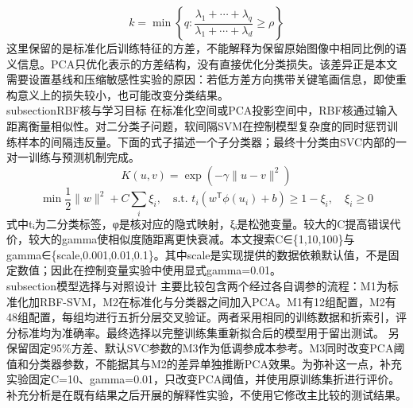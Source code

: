 \documentclass[supercite]{HustGSClassPaper}
\begin{document}
\begin{equation}
k=\min\left\{q:\frac{\lambda_1+\cdots+\lambda_q}{\lambda_1+\cdots+\lambda_d}\ge\rho\right\}
\end{equation}
这里保留的是标准化后训练特征的方差，不能解释为保留原始图像中相同比例的语义信息。PCA只优化表示的方差结构，没有直接优化分类损失。该差异正是本文需要设置基线和压缩敏感性实验的原因：若低方差方向携带关键笔画信息，即使重构意义上的损失较小，也可能改变分类结果。
\\subsection{RBF核与学习目标}
在标准化空间或PCA投影空间中，RBF核通过输入距离衡量相似性。对二分类子问题，软间隔SVM在控制模型复杂度的同时惩罚训练样本的间隔违反量。下面的式子描述一个子分类器；最终十分类由SVC内部的一对一训练与预测机制完成。
\begin{equation}
K(u,v)=\exp\left(-\gamma\lVert u-v\rVert^2\right)
\end{equation}
\begin{equation}
\min \frac{1}{2}\lVert w\rVert^2+C\sum_i\xi_i,\quad \text{s.t. }t_i(w^\mathsf{T}\phi(u_i)+b)\ge 1-\xi_i,\quad \xi_i\ge0
\end{equation}
式中tᵢ为二分类标签，φ是核对应的隐式映射，ξᵢ是松弛变量。较大的C提高错误代价，较大的gamma使相似度随距离更快衰减。本文搜索C∈\{1,10,100\}与gamma∈\{scale,0.001,0.01,0.1\}。其中scale是实现提供的数据依赖默认值，不是固定数值；因此在控制变量实验中使用显式gamma=0.01。
\\subsection{模型选择与对照设计}
主要比较包含两个经过各自调参的流程：M1为标准化加RBF-SVM，M2在标准化与分类器之间加入PCA。M1有12组配置，M2有48组配置，每组均进行五折分层交叉验证。两者采用相同的训练数据和折索引，评分标准均为准确率。最终选择以完整训练集重新拟合后的模型用于留出测试。
另保留固定95\%方差、默认SVC参数的M3作为低调参成本参考。M3同时改变PCA阈值和分类器参数，不能据其与M2的差异单独推断PCA效果。为弥补这一点，补充实验固定C=10、gamma=0.01，只改变PCA阈值，并使用原训练集折进行评价。补充分析是在既有结果之后开展的解释性实验，不使用它修改主比较的测试结果。
\end{document}
